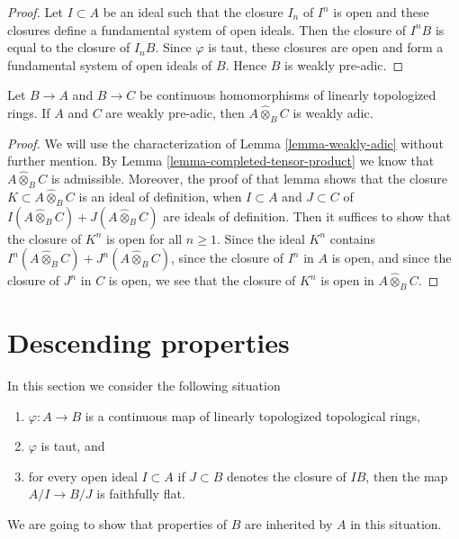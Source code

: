 \begin{proof}
Let $I \subset A$ be an ideal such that the closure $I_n$ of $I^n$
is open and these closures define a fundamental system of open ideals.
Then the closure of $I^nB$ is equal to the closure of $I_nB$.
Since $\varphi$ is taut, these closures are open and form a fundamental
system of open ideals of $B$. Hence $B$ is weakly pre-adic.
\end{proof}

\begin{lemma}
\label{lemma-completed-tensor-product-weakly-adic}
Let $B \to A$ and $B \to C$ be continuous homomorphisms of
linearly topologized rings. If $A$ and $C$ are weakly pre-adic, then
$A \widehat{\otimes}_B C$ is weakly adic.
\end{lemma}

\begin{proof}
We will use the characterization of Lemma \ref{lemma-weakly-adic}
without further mention. By Lemma \ref{lemma-completed-tensor-product}
we know that $A \widehat{\otimes}_B C$ is admissible.
Moreover, the proof of that lemma shows that
the closure $K \subset A \widehat{\otimes}_B C$
is an ideal of definition, when $I \subset A$ and $J \subset C$
of $I(A \widehat{\otimes}_B C) + J(A \widehat{\otimes}_B C)$
are ideals of definition. Then it suffices to show that
the closure of $K^n$ is open for all $n \geq 1$.
Since the ideal $K^n$ contains
$I^n(A \widehat{\otimes}_B C) + J^n(A \widehat{\otimes}_B C)$,
since the closure of $I^n$ in $A$ is open, and
since the closure of $J^n$ in $C$ is open, we
see that the closure of $K^n$ is open in $A \widehat{\otimes}_B C$.
\end{proof}






\section{Descending properties}
\label{section-taut-descent}

\noindent
In this section we consider the following situation
\begin{enumerate}
\item $\varphi : A \to B$ is a continuous map of
linearly topologized topological rings,
\item $\varphi$ is taut, and
\item for every open ideal $I \subset A$ if $J \subset B$
denotes the closure of $IB$, then the map $A/I \to B/J$
is faithfully flat.
\end{enumerate}
We are going to show that properties of $B$ are inherited
by $A$ in this situation.

